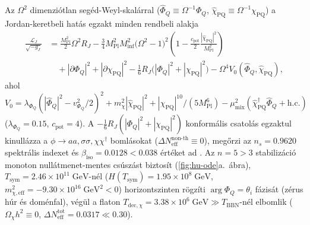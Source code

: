 \documentclass[11pt,a4paper]{article}
\begin{document}
Az $\Omega^2$ dimenziótlan segéd-Weyl-skalárral ($\hat{\Phi}_Q \equiv \Omega^{-1}\Phi_Q$, $\hat{\chi}_{\mathrm{PQ}} \equiv \Omega^{-1}\chi_{\mathrm{PQ}}$) \cite{Whitt1984,Olcsak2026Paper24} a Jordan-keretbeli hatás egzakt minden rendbeli alakja
\begin{equation}
\begin{aligned}
\frac{\mathcal{L}_J}{\sqrt{-g_J}} &= \frac{M_{\mathrm{Pl}}^2}{2}\Omega^2 R_J - \frac{3}{4}M_{\mathrm{Pl}}^2 M_{\mathrm{inf}}^2\big(\Omega^2 - 1\big)^2\!\left(1 - \frac{c_{\mathrm{pot}}}{2}\frac{|\hat{\chi}_{\mathrm{PQ}}|^2}{M_{\mathrm{Pl}}^2}\right) \\
&\quad + |\partial\Phi_Q|^2 + |\partial\chi_{\mathrm{PQ}}|^2 - \frac{1}{6}R_J\big(|\Phi_Q|^2 + |\chi_{\mathrm{PQ}}|^2\big) - \Omega^4 V_0(\hat{\Phi}_Q, \hat{\chi}_{\mathrm{PQ}}),
\end{aligned}
\end{equation}
ahol $V_0 = \lambda_{\Phi_Q}(|\hat{\Phi}_Q|^2 - v_{\Phi_Q}^2/2)^2 + m_\chi^2|\hat{\chi}_{\mathrm{PQ}}|^2 + |\hat{\chi}_{\mathrm{PQ}}|^{10}/(5 M_{\mathrm{Pl}}^6) - \mu_{\mathrm{mix}}^2(\hat{\chi}_{\mathrm{PQ}}^\dagger\hat{\Phi}_Q + \mathrm{h.c.})$ ($\lambda_{\Phi_Q} = 0.15$, $c_{\mathrm{pot}} = 4$). A $-\frac{1}{6}R_J(|\Phi_Q|^2+|\chi_{\mathrm{PQ}}|^2)$ konformális csatolás egzaktul kinullázza a $\phi \to aa, \sigma\sigma, \chi\chi^\dagger$ bomlásokat ($\Delta N_{\mathrm{eff}}^{\text{non-th}} \equiv 0$), megőrzi az $n_s = 0.9620$ spektrális indexet és $\beta_{\mathrm{iso}} = 0.0128 < 0.038$ értéket ad \cite{Linde1991Axion,HarigayaIbeKawasakiYanagida2015,KasuyaKawasakiYanagida1997}. Az $n = 5 > 3$ stabilizáció monoton nullátmenet-mentes csúszást biztosít (\ref{fig:hu-ode}a.\ ábra), $T_{\mathrm{sym}} = 2.46\times 10^{11}\;\mathrm{GeV}$-nél ($H(T_{\mathrm{sym}}) = 1.95\times 10^8\;\mathrm{GeV}$, $m_{\chi,\mathrm{eff}}^2 = -9.30\times 10^{16}\;\mathrm{GeV}^2 < 0$) horizontszinten rögzíti $\arg\Phi_Q = \theta_i$ fázisát (zérus húr és doménfal), végül a flaton $T_{\mathrm{dec},\chi} = 3.38\times 10^6\;\mathrm{GeV} \gg T_{\mathrm{BBN}}$-nél elbomlik ($\Omega_\chi h^2 \equiv 0$, $\Delta N_{\mathrm{eff}}^{\mathrm{tot}} = 0.0317 \ll 0.30$).
\end{document}
